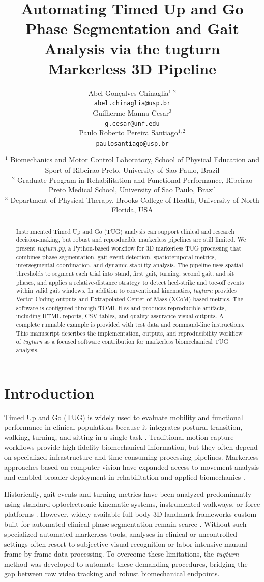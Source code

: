 \documentclass{article}
\title{Automating Timed Up and Go Phase Segmentation and Gait Analysis via the tugturn Markerless 3D Pipeline}
\author{
  Abel Gon\c{c}alves Chinaglia\orcidlink{0000-0002-6955-7187}$^{1,2}$ \\
  \texttt{abel.chinaglia@usp.br} \\
  \And
  Guilherme Manna Cesar\orcidlink{0000-0002-5596-9439}$^{3}$ \\
  \texttt{g.cesar@unf.edu} \\
  \And
  Paulo Roberto Pereira Santiago\orcidlink{0000-0002-9460-8847}$^{1,2}$ \\
  \texttt{paulosantiago@usp.br} \\
}
\date{
  $^1$ Biomechanics and Motor Control Laboratory, School of Physical Education and Sport of Ribeirao Preto, University of Sao Paulo, Brazil \\
  $^2$ Graduate Program in Rehabilitation and Functional Performance, Ribeirao Preto Medical School, University of Sao Paulo, Brazil \\
  $^3$ Department of Physical Therapy, Brooks College of Health, University of North Florida, USA \\
}
\begin{document}
\maketitle

\begin{abstract}
Instrumented Timed Up and Go (TUG) analysis can support clinical and research decision-making, but robust and reproducible markerless pipelines are still limited. We present \textit{tugturn.py}, a Python-based workflow for 3D markerless TUG processing that combines phase segmentation, gait-event detection, spatiotemporal metrics, intersegmental coordination, and dynamic stability analysis. The pipeline uses spatial thresholds to segment each trial into stand, first gait, turning, second gait, and sit phases, and applies a relative-distance strategy to detect heel-strike and toe-off events within valid gait windows. In addition to conventional kinematics, \textit{tugturn} provides Vector Coding outputs and Extrapolated Center of Mass (XCoM)-based metrics. The software is configured through TOML files and produces reproducible artifacts, including HTML reports, CSV tables, and quality-assurance visual outputs. A complete runnable example is provided with test data and command-line instructions. This manuscript describes the implementation, outputs, and reproducibility workflow of \textit{tugturn} as a focused software contribution for markerless biomechanical TUG analysis.
\end{abstract}


\section{Introduction}
Timed Up and Go (TUG) is widely used to evaluate mobility and functional performance in clinical populations because it integrates postural transition, walking, turning, and sitting in a single task \citep{podsiadlo1991}. Traditional motion-capture workflows provide high-fidelity biomechanical information, but they often depend on specialized infrastructure and time-consuming processing pipelines. Markerless approaches based on computer vision have expanded access to movement analysis and enabled broader deployment in rehabilitation and applied biomechanics \citep{lugaresi2019mediapipe, nath2019using}.

Historically, gait events and turning metrics have been analyzed predominantly using standard optoelectronic kinematic systems, instrumented walkways, or force platforms \citep{khobkhun2022investigation, thanakamchokchai2025effects}. However, widely available full-body 3D-landmark frameworks custom-built for automated clinical phase segmentation remain scarce \citep{tahara2025predicting}. Without such specialized automated markerless tools, analyses in clinical or uncontrolled settings often resort to subjective visual recognition or labor-intensive manual frame-by-frame data processing. To overcome these limitations, the \textit{tugturn} method was developed to automate these demanding procedures, bridging the gap between raw video tracking and robust biomechanical endpoints.
\end{document}
